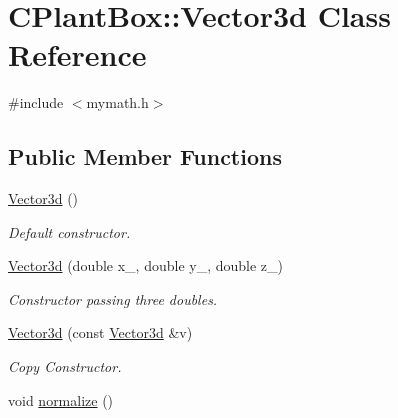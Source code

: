 \hypertarget{classCPlantBox_1_1Vector3d}{}\section{C\+Plant\+Box\+:\+:Vector3d Class Reference}
\label{classCPlantBox_1_1Vector3d}


{\ttfamily \#include $<$mymath.\+h$>$}

\subsection*{Public Member Functions}
\begin{DoxyCompactItemize}
\item 
\mbox{\label{classCPlantBox_1_1Vector3d_a7bf895d95e6c07ad338f9def9fe3558e}} 
\hyperlink{classCPlantBox_1_1Vector3d_a7bf895d95e6c07ad338f9def9fe3558e}{Vector3d} ()
\begin{DoxyCompactList}\small\item\em Default constructor. \end{DoxyCompactList}\item 
\mbox{\label{classCPlantBox_1_1Vector3d_aac056db30d1d1f0042d6cd9fbfde82a9}} 
\hyperlink{classCPlantBox_1_1Vector3d_aac056db30d1d1f0042d6cd9fbfde82a9}{Vector3d} (double x\+\_\+, double y\+\_\+, double z\+\_\+)
\begin{DoxyCompactList}\small\item\em Constructor passing three doubles. \end{DoxyCompactList}\item 
\mbox{\label{classCPlantBox_1_1Vector3d_a371659e86a306e5d643ccd8fc8a59953}} 
\hyperlink{classCPlantBox_1_1Vector3d_a371659e86a306e5d643ccd8fc8a59953}{Vector3d} (const \hyperlink{classCPlantBox_1_1Vector3d}{Vector3d} \&v)
\begin{DoxyCompactList}\small\item\em Copy Constructor. \end{DoxyCompactList}\item 
\mbox{\label{classCPlantBox_1_1Vector3d_a70bec8ed1f173cbdb2cdd9bb40b62965}} 
void \hyperlink{classCPlantBox_1_1Vector3d_a70bec8ed1f173cbdb2cdd9bb40b62965}{normalize} ()

\end{DoxyCompactItemize}

